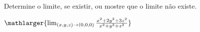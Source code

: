 Determine o limite, se existir, ou mostre que o limite não existe.

\item$\mathlarger{\lim_{(x,y,z)\rightarrow(0,0,0)} \frac{x^2+2y^2+3z^2}{x^2+y^2+z^2}}$
